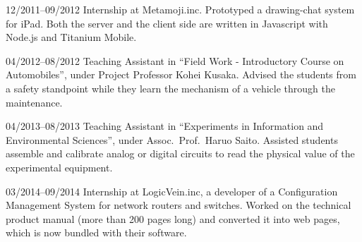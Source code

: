 \documentclass[letterpaper]{article}
\begin{document}
\begin{CV}

\item[12/2011--09/2012] Internship at Metamoji.inc.  Prototyped a
  drawing-chat system for iPad. Both the server and the client side are
  written in Javascript with Node.js and Titanium Mobile.

\item[04/2012--08/2012] Teaching Assistant in ``Field Work -
 Introductory Course on Automobiles'', under
 Project Professor Kohei Kusaka.
 Advised the students from a safety standpoint while they
 learn the mechanism of a vehicle through the maintenance.
 
\item[04/2013--08/2013] Teaching Assistant in ``Experiments in
 Information and Environmental Sciences'', under
 Assoc.\ Prof.\ Haruo Saito.
 Assisted students assemble and calibrate analog or digital
 circuits to read the physical value of the
 experimental equipment.

\item[03/2014--09/2014] Internship at LogicVein.inc,
 a developer of a Configuration Management System
 for network routers and switches.
 Worked on %
 the technical product manual (more than 200 pages long) %
 and converted it into 
 web pages, which is now bundled with their software.
\end{CV}
\end{document}
